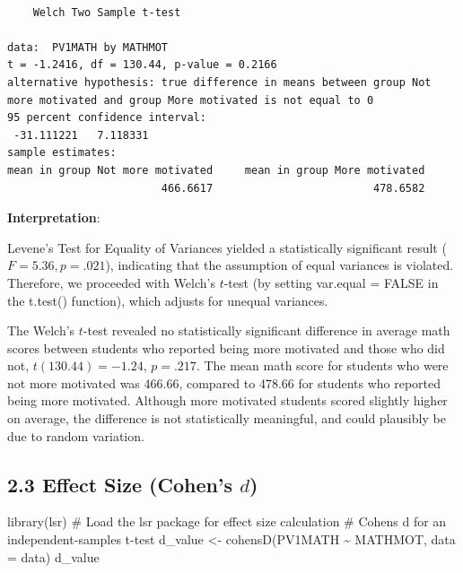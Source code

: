 \documentclass[
  letterpaper,
  DIV=11,
  numbers=noendperiod]{scrreprt}
\newenvironment{Shaded}{\begin{snugshade}}{\end{snugshade}}
\newcommand{\AttributeTok}[1]{\textcolor[rgb]{0.40,0.45,0.13}{#1}}
\newcommand{\CommentTok}[1]{\textcolor[rgb]{0.37,0.37,0.37}{#1}}
\newcommand{\FunctionTok}[1]{\textcolor[rgb]{0.28,0.35,0.67}{#1}}
\newcommand{\NormalTok}[1]{\textcolor[rgb]{0.00,0.23,0.31}{#1}}
\newcommand{\OtherTok}[1]{\textcolor[rgb]{0.00,0.23,0.31}{#1}}
\newcommand{\SpecialCharTok}[1]{\textcolor[rgb]{0.37,0.37,0.37}{#1}}
\begin{document}
\begin{verbatim}

    Welch Two Sample t-test

data:  PV1MATH by MATHMOT
t = -1.2416, df = 130.44, p-value = 0.2166
alternative hypothesis: true difference in means between group Not more motivated and group More motivated is not equal to 0
95 percent confidence interval:
 -31.111221   7.118331
sample estimates:
mean in group Not more motivated     mean in group More motivated 
                        466.6617                         478.6582 
\end{verbatim}

\textbf{Interpretation}:

Levene's Test for Equality of Variances yielded a statistically
significant result (\(F = 5.36, p = .021\)), indicating that the
assumption of equal variances is violated. Therefore, we proceeded with
Welch's \(t\)-test (by setting var.equal = FALSE in the t.test()
function), which adjusts for unequal variances.

The Welch's \(t\)-test revealed no statistically significant difference
in average math scores between students who reported being more
motivated and those who did not, \(t(130.44) = -1.24\), \(p = .217\).
The mean math score for students who were not more motivated was 466.66,
compared to 478.66 for students who reported being more motivated.
Although more motivated students scored slightly higher on average, the
difference is not statistically meaningful, and could plausibly be due
to random variation.

\subsection*{\texorpdfstring{2.3 Effect Size (Cohen's
\(d\))}{2.3 Effect Size (Cohen's d)}}\label{effect-size-cohens-d}

\begin{Shaded}
\begin{Highlighting}[]
\FunctionTok{library}\NormalTok{(lsr) }\CommentTok{\# Load the lsr package for effect size calculation }
\CommentTok{\# Cohen\textquotesingle{}s d for an independent{-}samples t{-}test }
\NormalTok{d\_value }\OtherTok{\textless{}{-}} \FunctionTok{cohensD}\NormalTok{(PV1MATH }\SpecialCharTok{\textasciitilde{}}\NormalTok{ MATHMOT, }\AttributeTok{data =}\NormalTok{ data) }
\NormalTok{d\_value }
\end{Highlighting}
\end{Shaded}
\end{document}
